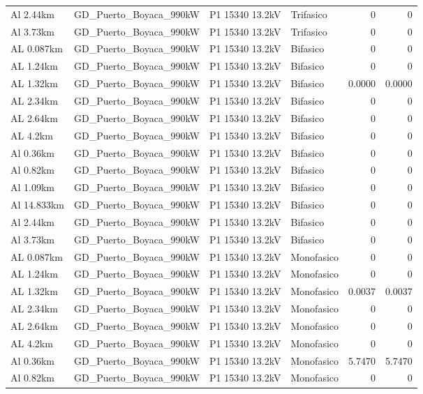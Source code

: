 \documentclass[11pt,a4paper]{article}
\begin{document}
\begin{longtable}{llllrr}
Al 2.44km & GD\_Puerto\_Boyaca\_990kW & P1 15340 13.2kV & Trifasico & 0 & 0 \\
Al 3.73km & GD\_Puerto\_Boyaca\_990kW & P1 15340 13.2kV & Trifasico & 0 & 0 \\
AL 0.087km & GD\_Puerto\_Boyaca\_990kW & P1 15340 13.2kV & Bifasico & 0 & 0 \\
AL 1.24km & GD\_Puerto\_Boyaca\_990kW & P1 15340 13.2kV & Bifasico & 0 & 0 \\
AL 1.32km & GD\_Puerto\_Boyaca\_990kW & P1 15340 13.2kV & Bifasico & 0.0000 & 0.0000 \\
AL 2.34km & GD\_Puerto\_Boyaca\_990kW & P1 15340 13.2kV & Bifasico & 0 & 0 \\
AL 2.64km & GD\_Puerto\_Boyaca\_990kW & P1 15340 13.2kV & Bifasico & 0 & 0 \\
AL 4.2km & GD\_Puerto\_Boyaca\_990kW & P1 15340 13.2kV & Bifasico & 0 & 0 \\
Al 0.36km & GD\_Puerto\_Boyaca\_990kW & P1 15340 13.2kV & Bifasico & 0 & 0 \\
Al 0.82km & GD\_Puerto\_Boyaca\_990kW & P1 15340 13.2kV & Bifasico & 0 & 0 \\
Al 1.09km & GD\_Puerto\_Boyaca\_990kW & P1 15340 13.2kV & Bifasico & 0 & 0 \\
Al 14.833km & GD\_Puerto\_Boyaca\_990kW & P1 15340 13.2kV & Bifasico & 0 & 0 \\
Al 2.44km & GD\_Puerto\_Boyaca\_990kW & P1 15340 13.2kV & Bifasico & 0 & 0 \\
Al 3.73km & GD\_Puerto\_Boyaca\_990kW & P1 15340 13.2kV & Bifasico & 0 & 0 \\
AL 0.087km & GD\_Puerto\_Boyaca\_990kW & P1 15340 13.2kV & Monofasico & 0 & 0 \\
AL 1.24km & GD\_Puerto\_Boyaca\_990kW & P1 15340 13.2kV & Monofasico & 0 & 0 \\
AL 1.32km & GD\_Puerto\_Boyaca\_990kW & P1 15340 13.2kV & Monofasico & 0.0037 & 0.0037 \\
AL 2.34km & GD\_Puerto\_Boyaca\_990kW & P1 15340 13.2kV & Monofasico & 0 & 0 \\
AL 2.64km & GD\_Puerto\_Boyaca\_990kW & P1 15340 13.2kV & Monofasico & 0 & 0 \\
AL 4.2km & GD\_Puerto\_Boyaca\_990kW & P1 15340 13.2kV & Monofasico & 0 & 0 \\
Al 0.36km & GD\_Puerto\_Boyaca\_990kW & P1 15340 13.2kV & Monofasico & 5.7470 & 5.7470 \\
Al 0.82km & GD\_Puerto\_Boyaca\_990kW & P1 15340 13.2kV & Monofasico & 0 & 0 \\

\end{longtable}
\end{document}
